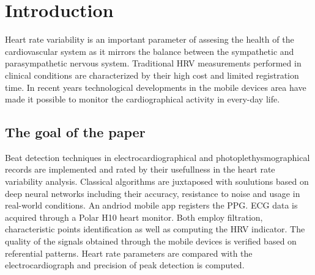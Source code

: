 \documentclass[journal]{IEEEtran}
\begin{document}
{\section{Introduction}
Heart rate variability is an important parameter of assesing the health of the cardiovascular system as it mirrors the balance between the sympathetic and parasympathetic nervous system. Traditional HRV measurements performed in clinical conditions are characterized by their high cost and limited registration time. In recent years technological developments in the mobile devices area have made it possible to monitor the cardiographical activity in every-day life.

\subsection{The goal of the paper}
Beat detection techniques in electrocardiographical and photoplethysmographical records are implemented and rated by their usefullness in the heart rate variability analysis. Classical algorithms are juxtaposed with soulutions based on deep neural networks including their accuracy, resistance to noise and usage in real-world conditions. An andriod mobile app registers the PPG. ECG data is acquired through a Polar H10 heart monitor. Both employ filtration, characteristic points identification as well as computing the HRV indicator. The quality of the signals obtained through the mobile devices is verified based on referential patterns. Heart rate parameters are compared with the electrocardiograph and precision of peak detection is computed.

}
\end{document}
